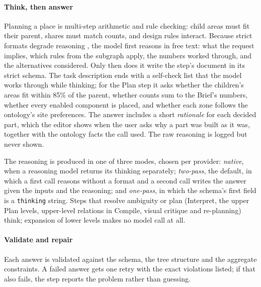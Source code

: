 \documentclass[conference]{IEEEtran}
\begin{document}
\paragraph{Think, then answer} Planning a place is multi-step arithmetic and rule
checking: child areas must fit their parent, shares must match counts, and design rules
interact. Because strict formats degrade reasoning \cite{tam2024}, the model first
reasons in free text: what the request implies, which rules from the subgraph apply,
the numbers worked through, and the alternatives considered. Only then does it write the
step's document in its strict schema. The task description ends with a self-check list
that the model works through while thinking; for the Plan step it asks whether the
children's areas fit within 85\% of the parent, whether counts sum to the Brief's numbers,
whether every enabled component is placed, and whether each zone follows the ontology's
site preferences. The answer includes a short \emph{rationale} for each decided part,
which the editor shows when the user asks why a part was built as it was, together with
the ontology facts the call used. The raw reasoning is logged but never shown.

The reasoning is produced in one of three modes, chosen per provider: \emph{native}, when
a reasoning model returns its thinking separately; \emph{two-pass}, the default, in which a
first call reasons without a format and a second call writes the answer given the inputs
and the reasoning; and \emph{one-pass}, in which the schema's first field is a
\texttt{thinking} string. Steps that resolve ambiguity or plan (Interpret, the upper Plan
levels, upper-level relations in Compile, visual critique and re-planning) think;
expansion of lower levels makes no model call at all.

\paragraph{Validate and repair} Each answer is validated against the schema, the tree
structure and the aggregate constraints. A failed answer gets one retry with the exact
violations listed; if that also fails, the step reports the problem rather than
guessing.
\end{document}
